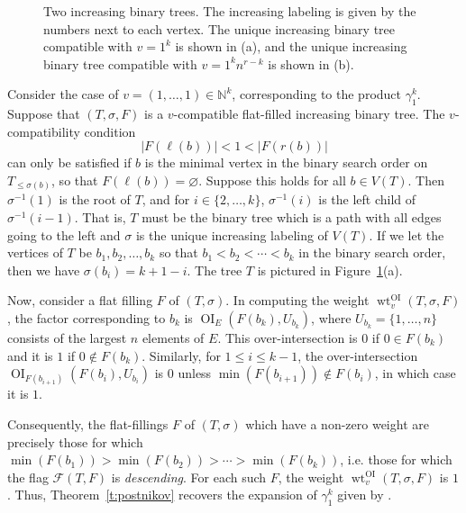 \documentclass[ALCO,published]{cedram}
\numberwithin{equation}{section}
\numberwithin{figure}{section}
\newcommand{\N}{\mathbb{N}}
\newcommand{\cF}{\mathcal{F}}
\DeclareMathOperator{\OI}{OI}
\DeclareMathOperator{\wt}{wt}
\begin{document}
\begin{figure}

\caption{Two increasing binary trees. The increasing labeling is given by the numbers next to each vertex. The  unique increasing binary tree compatible with $v = 1^k$ is shown in (a), and the unique increasing binary tree compatible with $v = 1^kn^{r-k}$ is shown in (b).}
\label{f:postnikov}
\end{figure}

\begin{exam} \label{ex:descending}
Consider the case of $v = (1,\ldots,1) \in \N^k$, corresponding to the product $\gamma_1^k$. Suppose that $(T,\sigma, F)$ is a $v$-compatible flat-filled increasing binary tree. The $v$-compatibility condition
\[ |F(\ell(b))| < 1 < |F(r(b))|\]
can only be satisfied if $b$ is the minimal vertex in the binary search order on $T_{\leq \sigma(b)}$, so that $F(\ell(b)) = \varnothing$. Suppose this holds for all $b \in V(T)$. Then $\sigma^{-1}(1)$ is the root of $T$, and for $i \in \{2,\ldots, k\}$, $\sigma^{-1}(i)$ is the left child of $\sigma^{-1}(i-1)$. That is, $T$ must be the binary tree which is a path with all edges going to the left and $\sigma$ is the unique increasing labeling of $V(T)$. If we let the vertices of $T$ be $b_1, b_2, \ldots, b_k$ so that $b_1 < b_2 < \cdots < b_k$ in the binary search order, then we have $\sigma(b_i) = k+1-i$. The tree $T$ is pictured in Figure~\ref{f:postnikov}(a).

Now, consider a flat filling $F$ of $(T,\sigma)$. In computing the weight $\wt^{\OI}_v(T,\sigma,F)$, the factor corresponding to $b_k$ is $\OI_{E}(F(b_k),U_{b_k})$, where $U_{b_k} = \{1,\ldots,n\}$ consists of the largest $n$ elements of $E$. This over-intersection is $0$ if $0 \in F(b_k)$ and it is $1$ if $0 \notin F(b_k)$. Similarly, for $1 \leq i \leq k-1$, the over-intersection $\OI_{F(b_{i+1})}(F(b_i), U_{b_i})$ is $0$ unless $\min(F(b_{i+1})) \notin F(b_i)$, in which case it is $1$.

Consequently, the flat-fillings $F$ of $(T,\sigma)$ which have a non-zero weight are precisely those for which $\min(F(b_1)) > \min(F(b_2)) > \cdots > \min(F(b_k))$, i.e. those for which the flag $\cF(T,F)$ is {\em descending}. For each such $F$, the weight $\wt^{\OI}_v(T,\sigma,F)$ is $1$. Thus, Theorem~\ref{t:postnikov} recovers the expansion of $\gamma_1^k$ given by \cite[Lemma~9.4]{AHK}.
\end{exam}
\end{document}
